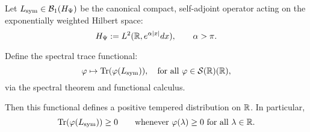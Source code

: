 \begin{lemma}
\label{lem:trace_distribution_positive}

Let \( L_{\mathrm{sym}} \in \mathcal{B}_1(H_{\Psi}) \) be the canonical compact, self-adjoint operator acting on the exponentially weighted Hilbert space:
\[
H_{\Psi} := L^2(\mathbb{R}, e^{\alpha |x|} dx), \qquad \alpha > \pi.
\]

Define the spectral trace functional:
\[
\varphi \mapsto \operatorname{Tr}(\varphi(L_{\mathrm{sym}})),
\quad \text{for all } \varphi \in \mathcal{S}(\mathbb{R})(\mathbb{R}),
\]
via the spectral theorem and functional calculus.

Then this functional defines a positive tempered distribution on \( \mathbb{R} \). In particular,
\[
\operatorname{Tr}(\varphi(L_{\mathrm{sym}})) \ge 0
\qquad \text{whenever } \varphi(\lambda) \ge 0 \text{ for all } \lambda \in \mathbb{R}.
\]
\end{lemma}
